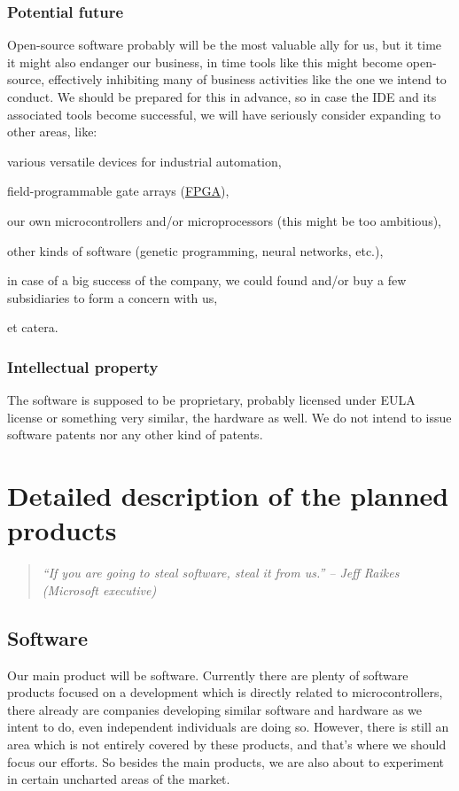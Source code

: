 \documentclass[a4paper,twoside,15pt]{book}
\begin{document}
        \subsection{Potential future}
            Open-source software probably will be the most valuable ally for us, but it time it might also endanger our business, in time tools like this might become open-source, effectively inhibiting many of business activities like the one we intend to conduct. We should be prepared for this in advance, so in case the IDE and its associated tools become successful, we will have seriously consider expanding to other areas, like:
            \begin{dinglist}{73}
                \item various versatile devices for industrial automation,
                \item field-programmable gate arrays (\href{http://en.wikipedia.org/wiki/Programmable_gate_array}{FPGA}),
                \item our own microcontrollers and/or microprocessors (this might be too ambitious),
                \item other kinds of software (genetic programming, neural networks, etc.),
                \item in case of a big success of the company, we could found and/or buy a few subsidiaries to form a concern with us,
                \item et catera.
            \end{dinglist}

        \subsection{Intellectual property}
            The software is supposed to be proprietary, probably licensed under EULA license or something very similar, the hardware as well. We do not intend to issue software patents nor any other kind of patents.

\chapter{Detailed description of the planned products}
    \begin{quote}
        \textit{``If you are going to steal software, steal it from us.'' -- Jeff Raikes (Microsoft executive)}
    \end{quote}

    \section{Software}
        Our main product will be software. Currently there are plenty of software products focused on a development which is directly related to microcontrollers, there already are companies developing similar software and hardware as we intent to do, even independent individuals are doing so. However, there is still an area which is not entirely covered by these products, and that's where we should focus our efforts. So besides the main products, we are also about to experiment in certain uncharted areas of the market.
\end{document}
